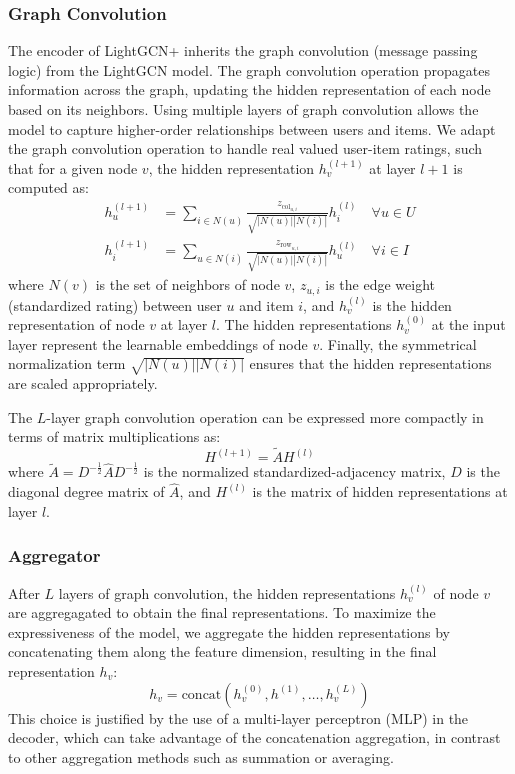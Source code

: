 \documentclass[10pt,conference,compsocconf]{IEEEtran}
\begin{document}
\subsubsection{Graph Convolution}
The encoder of LightGCN+ inherits the graph convolution (message passing logic) from the LightGCN model.
The graph convolution operation propagates information across the graph, updating the hidden representation of each node based on its neighbors.
Using multiple layers of graph convolution allows the model to capture higher-order relationships between users and items.
We adapt the graph convolution operation to handle real valued user-item ratings, such that
for a given node $v$, the hidden representation $h_v^{(l+1)}$ at layer $l+1$ is computed as:
\begin{align}
    h_u^{(l+1)} &= \sum_{i \in N(u)} \frac{z_{\text{col}_{u,i}}}{\sqrt{|N(u)||N(i)|}} h_i^{(l)} \quad \forall u \in U \\
    h_i^{(l+1)} &= \sum_{u \in N(i)} \frac{z_{\text{row}_{u,i}}}{\sqrt{|N(u)||N(i)|}} h_u^{(l)}  \quad \forall i \in I
\end{align}
where $N(v)$ is the set of neighbors of node $v$, $z_{u,i}$ is the edge weight (standardized rating) between user $u$ and item $i$, and $h_v^{(l)}$ is the hidden representation of node $v$ at layer $l$.
The hidden representations $h_v^{(0)}$ at the input layer represent the learnable embeddings of node $v$. Finally, the symmetrical normalization term $\sqrt{|N(u)||N(i)|}$ ensures that the hidden representations are scaled appropriately. 

The $L$-layer graph convolution operation can be expressed more compactly in terms of matrix multiplications as:
\begin{equation}
    H^{(l+1)} = \tilde{A} H^{(l)}
\end{equation}
where $\tilde{A} = D^{-\frac{1}{2}} \hat{A} D^{-\frac{1}{2}}$ is the normalized standardized-adjacency matrix, $D$ is the diagonal degree matrix of $\hat{A}$, and $H^{(l)}$ is the matrix of hidden representations at layer $l$.

\subsubsection{Aggregator}
After $L$ layers of graph convolution, the hidden representations $h_v^{(l)}$ of node $v$ are aggregagated to obtain the final representations.
To maximize the expressiveness of the model, we aggregate the hidden representations by concatenating them along the feature dimension, 
resulting in the final representation $h_v$:
\begin{equation}
    h_v = \text{concat}(h_v^{(0)}, h^{(1)}, \ldots, h_v^{(L)})
\end{equation}
This choice is justified by the use of a multi-layer perceptron (MLP) in the decoder, which can take advantage of the concatenation aggregation, in contrast to other aggregation methods such as summation or averaging.
\end{document}
